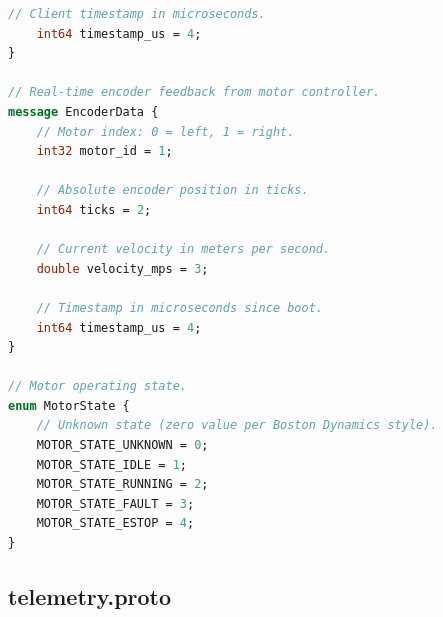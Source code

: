 \begin{lstlisting}[language=Protobuf, caption=star/v1/motor\_control.proto]
    // Client timestamp in microseconds.
    int64 timestamp_us = 4;
}

// Real-time encoder feedback from motor controller.
message EncoderData {
    // Motor index: 0 = left, 1 = right.
    int32 motor_id = 1;

    // Absolute encoder position in ticks.
    int64 ticks = 2;

    // Current velocity in meters per second.
    double velocity_mps = 3;

    // Timestamp in microseconds since boot.
    int64 timestamp_us = 4;
}

// Motor operating state.
enum MotorState {
    // Unknown state (zero value per Boston Dynamics style).
    MOTOR_STATE_UNKNOWN = 0;
    MOTOR_STATE_IDLE = 1;
    MOTOR_STATE_RUNNING = 2;
    MOTOR_STATE_FAULT = 3;
    MOTOR_STATE_ESTOP = 4;
}
\end{lstlisting}

\subsection{telemetry.proto}

